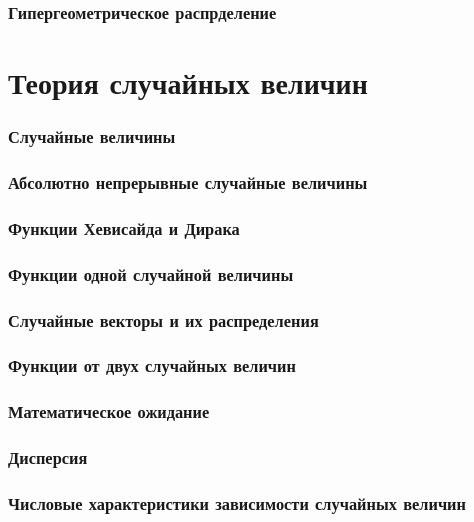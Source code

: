 \section{Гипергеометрическое распрделение}



\part{Теория случайных величин}

\section{Случайные величины}

\section{Абсолютно непрерывные случайные величины}

\section{Функции Хевисайда и Дирака}

\section{Функции одной случайной величины}

\section{Случайные векторы и их распределения}

\section{Функции от двух случайных величин}

\section{Математическое ожидание}

\section{Дисперсия}

\section{Числовые характеристики зависимости
случайных величин}


